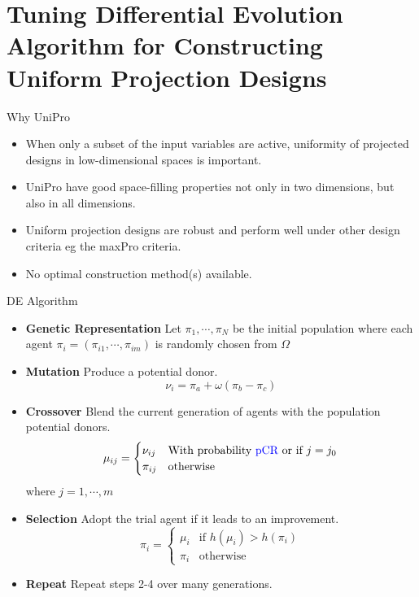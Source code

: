 \documentclass{beamer}
\begin{document}
\section{Tuning Differential Evolution Algorithm for Constructing Uniform Projection Designs}

\begin{frame}{Why UniPro}
 \begin{itemize}
  \item When only a subset of the input variables are active, uniformity of projected designs in low-dimensional spaces is important.
\item UniPro have good space-filling properties not only in two dimensions, but also in all dimensions. \parencite{sun2019uniform}
\item Uniform projection designs are robust and perform well under other design
criteria eg the maxPro criteria. \parencite{sun2019uniform}
\item No optimal construction method(s) available.
  \end{itemize}
\end{frame}
\begin{frame}{DE Algorithm}
    \begin{itemize}
      \item \textbf{Genetic Representation} Let $\pi_1,\cdots,\pi_N$ be the initial population where each agent $\pi_i = (\pi_{i1},\cdots,\pi_{im})$ is randomly chosen from $\Omega$
      \item \textbf{Mutation} Produce a potential donor.
      $$
      \nu_i = \pi_a + \omega(\pi_b - \pi_c)
      $$
      \item \textbf{Crossover} Blend the current generation of agents with the population potential donors.
      $$
      \mu_{ij}=\begin{cases}
      \nu_{ij} & \text{With probability \textcolor{blue}{pCR} or if } j=j_0\\
      \pi_{ij} & \text{otherwise}
      \end{cases}
      $$
      where $j = 1,\cdots, m$
      \item \textbf{Selection} Adopt the trial agent if it leads to an improvement.
      $$\pi_i = \begin{cases}
          \mu_i&\text{if } h(\mu_i) > h(\pi_i)\\
          \pi_i &\text{otherwise}
      \end{cases}$$
      \item \textbf{Repeat} Repeat steps 2-4 over many generations.
    \end{itemize}
  \end{frame}
\end{document}
